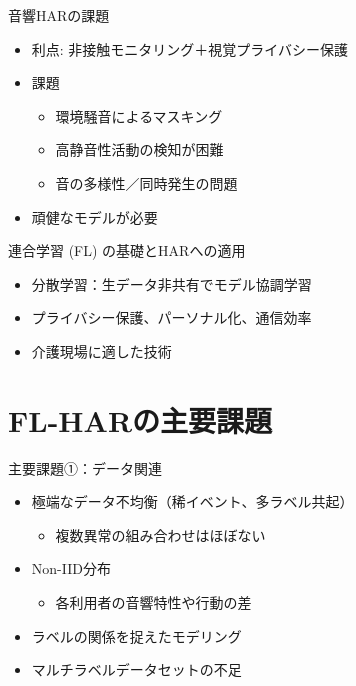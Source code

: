 \documentclass[unicode,12pt,aspectratio=169,dvipdfmx]{beamer}
\begin{document}
\begin{frame}{音響HARの課題}
  \begin{itemize}
    \item 利点: 非接触モニタリング＋視覚プライバシー保護
    \item 課題
    \begin{itemize}
        \item 環境騒音によるマスキング
        \item 高静音性活動の検知が困難
        \item 音の多様性／同時発生の問題
    \end{itemize}
    \item 頑健なモデルが必要
  \end{itemize}
\end{frame}
\begin{frame}{連合学習 (FL) の基礎とHARへの適用}
  \begin{itemize}
    \item 分散学習：生データ非共有でモデル協調学習
    \item プライバシー保護、パーソナル化、通信効率
    \item 介護現場に適した技術
  \end{itemize}
\end{frame}
\section{FL-HARの主要課題}
\begin{frame}{主要課題①：データ関連}
\begin{itemize}
  \item 極端なデータ不均衡（稀イベント、多ラベル共起）
    \begin{itemize}
      \item 複数異常の組み合わせはほぼない
    \end{itemize}
  \item Non-IID分布
    \begin{itemize}
      \item 各利用者の音響特性や行動の差
    \end{itemize}
  \item ラベルの関係を捉えたモデリング
  \item マルチラベルデータセットの不足
\end{itemize}
\end{frame}
\end{document}
